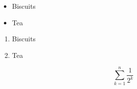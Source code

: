 \documentclass{article}
\begin{document}
\begin{itemize}
\item Biscuits
\item Tea
\end{itemize}
\begin{enumerate}
\item Biscuits
\item Tea
\end{enumerate}

\begin{equation}
\sum_{k=1}^{n} \frac{1}{2^k}
\end{equation}
\end{document}

